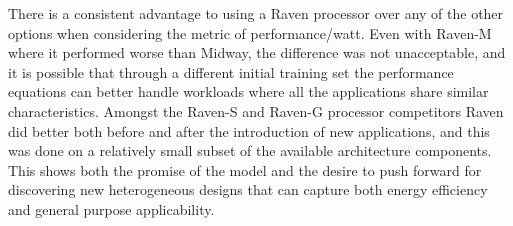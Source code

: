 There is a consistent advantage to using a Raven processor over any of
the other options when considering the metric of performance/watt.
Even with Raven-M where it performed worse than Midway, the difference
was not unacceptable, and it is possible that through a different
initial training set the performance equations can better handle
workloads where all the applications share similar
characteristics. Amongst the Raven-S and Raven-G processor competitors
Raven did better both before and after the introduction of new
applications, and this was done on a relatively small subset of the
available architecture components.  This shows both the promise of the
model and the desire to push forward for discovering new heterogeneous
designs that can capture both energy efficiency and general purpose
applicability.



